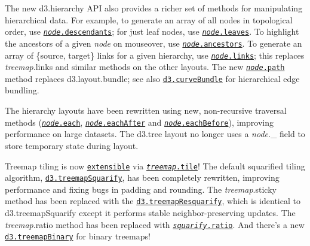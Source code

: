 The new d3.\+hierarchy A\+PI also provides a richer set of methods for manipulating hierarchical data. For example, to generate an array of all nodes in topological order, use \href{https://github.com/d3/d3-hierarchy/blob/master/README.md#node_descendants}{\tt {\itshape node}.descendants}; for just leaf nodes, use \href{https://github.com/d3/d3-hierarchy/blob/master/README.md#node_leaves}{\tt {\itshape node}.leaves}. To highlight the ancestors of a given {\itshape node} on mouseover, use \href{https://github.com/d3/d3-hierarchy/blob/master/README.md#node_ancestors}{\tt {\itshape node}.ancestors}. To generate an array of \{source, target\} links for a given hierarchy, use \href{https://github.com/d3/d3-hierarchy/blob/master/README.md#node_links}{\tt {\itshape node}.links}; this replaces {\itshape treemap}.links and similar methods on the other layouts. The new \href{https://github.com/d3/d3-hierarchy/blob/master/README.md#node_path}{\tt {\itshape node}.path} method replaces d3.\+layout.\+bundle; see also \href{https://github.com/d3/d3-shape/blob/master/README.md#curveBundle}{\tt d3.\+curve\+Bundle} for hierarchical edge bundling.

The hierarchy layouts have been rewritten using new, non-\/recursive traversal methods (\href{https://github.com/d3/d3-hierarchy/blob/master/README.md#node_each}{\tt {\itshape node}.each}, \href{https://github.com/d3/d3-hierarchy/blob/master/README.md#node_eachAfter}{\tt {\itshape node}.each\+After} and \href{https://github.com/d3/d3-hierarchy/blob/master/README.md#node_eachBefore}{\tt {\itshape node}.each\+Before}), improving performance on large datasets. The d3.\+tree layout no longer uses a {\itshape node}.\+\_\+ field to store temporary state during layout.

Treemap tiling is now \href{https://github.com/d3/d3-hierarchy/blob/master/README.md#treemap-tiling}{\tt extensible} via \href{https://github.com/d3/d3-hierarchy/blob/master/README.md#treemap_tile}{\tt {\itshape treemap}.tile}! The default squarified tiling algorithm, \href{https://github.com/d3/d3-hierarchy/blob/master/README.md#treemapSquarify}{\tt d3.\+treemap\+Squarify}, has been completely rewritten, improving performance and fixing bugs in padding and rounding. The {\itshape treemap}.sticky method has been replaced with the \href{https://github.com/d3/d3-hierarchy/blob/master/README.md#treemapResquarify}{\tt d3.\+treemap\+Resquarify}, which is identical to d3.\+treemap\+Squarify except it performs stable neighbor-\/preserving updates. The {\itshape treemap}.ratio method has been replaced with \href{https://github.com/d3/d3-hierarchy/blob/master/README.md#squarify_ratio}{\tt {\itshape squarify}.ratio}. And there’s a new \href{https://github.com/d3/d3-hierarchy/blob/master/README.md#treemapBinary}{\tt d3.\+treemap\+Binary} for binary treemaps!

